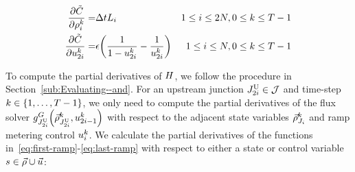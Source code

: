 \begin{eqnarray*}
\pfrac{\tilde{\cost}}{\discrete{\link}{\tind}}= & \Delta tL_{i} & 1\le i\le2\nlinks,0\le k\le T-1\\
\pfrac{\tilde{\cost}}{\ramp_{2\link}^{\tind}}= & \barrierTerm\left(\frac{1}{1-\ramp_{2\link}^{\tind}}-\frac{1}{\ramp_{2\link}^{\tind}}\right) & 1\le i\le\nlinks,0\le k\le T-1
\end{eqnarray*}


To compute the partial derivatives of $H$, we follow the procedure
in Section~\ref{sub:Evaluating--and}. For an upstream junction
$J_{2i}^{\text{U}}\in\mathcal{J}$ and time-step $k\in\intrange 1{\ntime-1}$,
we only need to compute the partial derivatives of the flux solver
$\god_{\jup{2\link}}\left(\juncstate{\jup{2\link}}{\tind},\ramp_{2\link-1}^{\tind}\right)_{\text{}}$
with respect to the adjacent state variables $\vec{\rho}_{J_{i}}^{k}$
and ramp metering control $u_{i}^{k}$. We calculate the
partial derivatives of the functions in~\eqref{eq:first-ramp}-\eqref{eq:last-ramp}
with respect to either a state or control variable$s\in\vec{\rho}\cup\vec{u}$:

